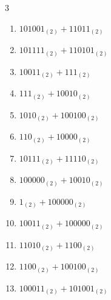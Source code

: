 \begin{multicols}{3}
\begin{enumerate}

  \item $101001_{(2)} + 11011_{(2)}$


  \item $101111_{(2)} + 110101_{(2)}$


\columnbreak %

  \item $10011_{(2)} + 111_{(2)}$


  \item $111_{(2)} + 10010_{(2)}$


  \item $1010_{(2)} + 100100_{(2)}$


  \item $110_{(2)} + 10000_{(2)}$


  \item $10111_{(2)} + 11110_{(2)}$


  \item $100000_{(2)} + 10010_{(2)}$


  \item $1_{(2)} + 100000_{(2)}$


  \item $10011_{(2)} + 100000_{(2)}$


  \item $11010_{(2)} + 1100_{(2)}$


  \item $1100_{(2)} + 100100_{(2)}$


\columnbreak %

\resetques

  \item $100011_{(2)} + 101001_{(2)}$


\end{enumerate}
\end{multicols}
